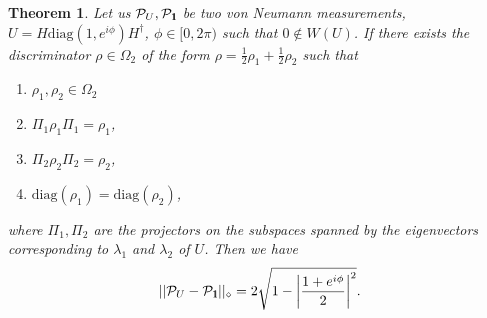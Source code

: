 \documentclass[preprint,12pt, a4paper]{elsarticle}
\newcommand{\1}{{\rm 1\hspace{-0.9mm}l}}
\newcommand{\Id}{{\rm 1\hspace{-0.9mm}l}}
\newcommand{\XX}{\mathcal{X}}
\newcommand{\diag}{\mathrm{diag}}
\newtheorem{theorem}{Theorem}
\begin{document}

\begin{theorem}\label{rozrpomiarow}
Let us $\mathcal{P}_U, \mathcal{P}_\1$ be two von Neumann measurements,  $U = 
H \diag(1, e^{i \phi}) H^\dagger$, $\phi \in [0, 2\pi)$ such that $0 
\not\in W(U)$.  If there exists the discriminator $\rho \in \Omega_2$ of the 
form $\rho = \frac{1}{2}\rho_1 + \frac{1}{2} \rho_2$ such that
	\begin{enumerate}
		\item $\rho_1,\rho_2 \in \Omega_2$
		\item $\Pi_1 \rho_1 \Pi_1 = \rho_1$,
		\item $\Pi_2 \rho_2 \Pi_2 = \rho_2$,
		\item  $\mathrm{diag}(\rho_1) = \mathrm{diag}(\rho_2)$,
	\end{enumerate}
	where $\Pi_1,\Pi_2 $ are the projectors on the subspaces
	spanned by the eigenvectors corresponding to $\lambda_1$ and $\lambda_2$ of 
	$U$. Then  we have 
	\begin{equation}
	||\mathcal{P}_U - \mathcal{P}_\Id||_\diamond = 2\sqrt{1- \left|\frac{1+e^{i 
	\phi}}{2}\right|^2}.
	\end{equation}
\end{theorem}
\end{document}
